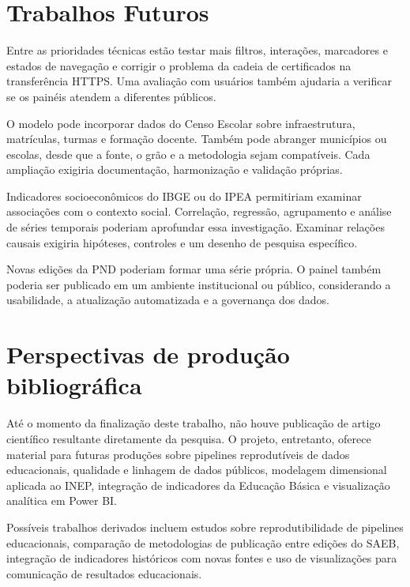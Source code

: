 \section{Trabalhos Futuros}

Entre as prioridades técnicas estão testar mais filtros, interações, marcadores e estados de navegação e corrigir o problema da cadeia de certificados na transferência HTTPS. Uma avaliação com usuários também ajudaria a verificar se os painéis atendem a diferentes públicos.

O modelo pode incorporar dados do Censo Escolar sobre infraestrutura, matrículas, turmas e formação docente. Também pode abranger municípios ou escolas, desde que a fonte, o grão e a metodologia sejam compatíveis. Cada ampliação exigiria documentação, harmonização e validação próprias.

Indicadores socioeconômicos do IBGE ou do IPEA permitiriam examinar associações com o contexto social. Correlação, regressão, agrupamento e análise de séries temporais poderiam aprofundar essa investigação. Examinar relações causais exigiria hipóteses, controles e um desenho de pesquisa específico.

Novas edições da PND poderiam formar uma série própria. O painel também poderia ser publicado em um ambiente institucional ou público, considerando a usabilidade, a atualização automatizada e a governança dos dados.

\section{Perspectivas de produção bibliográfica}

Até o momento da finalização deste trabalho, não houve publicação de artigo científico resultante diretamente da pesquisa. O projeto, entretanto, oferece material para futuras produções sobre pipelines reprodutíveis de dados educacionais, qualidade e linhagem de dados públicos, modelagem dimensional aplicada ao INEP, integração de indicadores da Educação Básica e visualização analítica em Power BI.

Possíveis trabalhos derivados incluem estudos sobre reprodutibilidade de pipelines educacionais, comparação de metodologias de publicação entre edições do SAEB, integração de indicadores históricos com novas fontes e uso de visualizações para comunicação de resultados educacionais.
